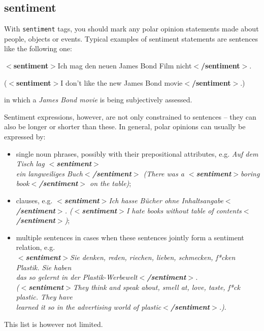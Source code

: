 \documentclass[11pt,a4paper]{article}
\newcommand{\xmltag}[1]{{\textbf{\small$<$#1$>$}}}
\newcommand{\sentiment}[1]{\xmltag{sentiment}#1\xmltag{/sentiment}}
\newenvironment{myexe}{
  \begin{exe}
    \ex\begin{center}
    \itshape
}{
    \end{center}
  \end{exe}
}
\begin{document}
\subsection{sentiment}\label{sec:sentiment}
With \texttt{sentiment} tags, you should mark any polar opinion
statements made about people, objects or events.  Typical examples of
sentiment statements are sentences like the following one:
\begin{myexe}
  \sentiment{Ich mag den neuen James Bond Film nicht}.

  (\sentiment{I don't like the new James Bond
    movie}.)\label{ex:sentiment}
\end{myexe}
{\setlength{\parindent}{0pt} in which a \textit{James Bond movie} is
  being subjectively assessed.}

Sentiment expressions, however, are not only constrained to sentences
-- they can also be longer or shorter than these.  In general, polar
opinions can usually be expressed by:
\begin{itemize}
\item single noun phrases, possibly with their prepositional
  attributes, e.g. \textit{Auf dem Tisch lag \xmltag{sentiment}\\ ein
    langweiliges Buch\xmltag{/sentiment} (There was a
    \sentiment{boring book} on the table)};
\item clauses, e.g. \textit{\sentiment{Ich hasse B\"ucher ohne
  Inhaltsangabe}. (\sentiment{I hate books without table of
  contents})};
\item multiple sentences in cases when these sentences jointly form a
  sentiment relation, e.g.\\\textit{\sentiment{Sie denken, reden,
      riechen, lieben, schmecken, f*cken Plastik. Sie haben\\das so
      gelernt in der Plastik-Werbewelt}.\\ (\sentiment{They think and
      speak about, smell at, love, taste, f*ck plastic.  They
      have\\ learned it so in the advertising world of plastic}.)}.
\end{itemize}
This list is however not limited.
\end{document}
